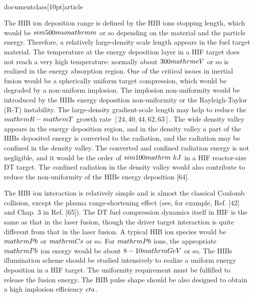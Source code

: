 \\documentclass[10pt]{article}
\begin{document}
{{{{{{The HIB ion deposition range is defined by the HIB ions stopping length, which would be $\\sim 500 \\mu \\mathrm{m}$ or so depending on the material and the particle energy. Therefore, a relatively large-density scale length appears in the fuel target material. The temperature at the energy deposition layer in a HIF target does not reach a very high temperature: normally about $300 \\mathrm{eV}$ or so is realized in the energy absorption region. One of the critical issues in inertial fusion would be a spherically uniform target compression, which would be degraded by a non-uniform implosion. The implosion non-uniformity would be introduced by the HIBs energy deposition non-uniformity or the Rayleigh-Taylor (R-T) instability. The large-density gradient-scale length may help to reduce the $\\mathrm{R}-\\mathrm{T}$ growth rate $[24,40,44,62,63]$. The wide density valley appears in the energy deposition region, and in the density valley a part of the HIBs deposited energy is converted to the radiation, and the radiation may be confined in the density valley. The converted and confined radiation energy is not negligible, and it would be the order of $\\sim 100 \\mathrm{~kJ}$ in a HIF reactor-size DT target. The confined radiation in the density valley would also contribute to reduce the non-uniformity of the HIBs energy deposition [64].

The HIB ion interaction is relatively simple and is almost the classical Coulomb collision, except the plasma range-shortening effect (see, for example, Ref. [42] and Chap. 3 in Ref. [65]). The DT fuel compression dynamics itself in HIF is the same as that in the laser fusion, though the driver target interaction is quite different from that in the laser fusion. A typical HIB ion species would be $\\mathrm{Pb}$ or $\\mathrm{Cs}$ or so. For $\\mathrm{Pb}$ ions, the appropriate $\\mathrm{Pb}$ ion energy would be about $8-10 \\mathrm{GeV}$ or so. The HIBs illumination scheme should be studied intensively to realize a uniform energy deposition in a HIF target. The uniformity requirement must be fulfilled to release the fusion energy. The HIB pulse shape should be also designed to obtain a high implosion efficiency $\\eta$.

}}}}}}
\end{document}
